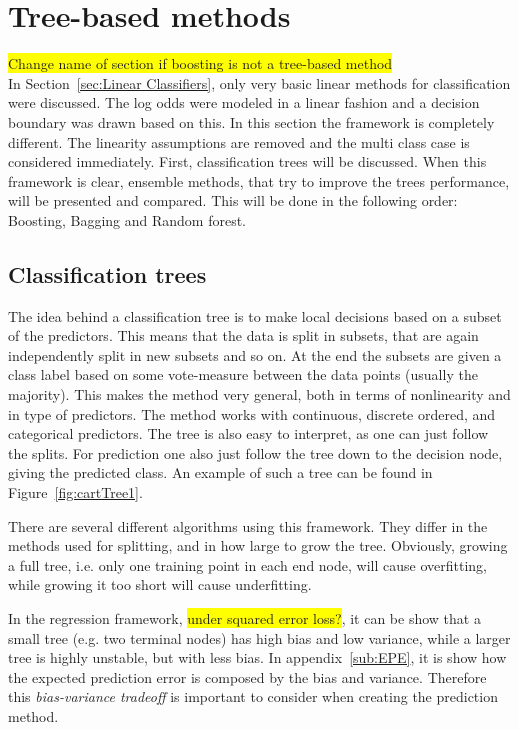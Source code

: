 \section{Tree-based methods}
\label{sec:Tree-based methods}
\colorbox{yellow}{Change name of section if boosting is not a tree-based method}\\
In Section~\ref{sec:Linear Classifiers}, only very basic linear methods for classification were discussed. The log odds were modeled in a linear fashion and a decision boundary was drawn based on this. In this section the framework is completely different. The linearity assumptions are removed and the multi class case is considered immediately. 
First, classification trees will be discussed. When this framework is clear, ensemble methods, that try to improve the trees performance, will be presented and compared. This will be done in the following order: Boosting, Bagging and Random forest. 
%
\subsection{Classification trees}
\label{sub:Classification trees}
The idea behind a classification tree is to make local decisions based on a subset of the predictors. This means that the data is split in subsets, that are again independently split in new subsets and so on. At the end the subsets are given a class label based on some vote-measure between the data points (usually the majority).
This makes the method very general, both in terms of nonlinearity and in type of predictors. The method works with continuous, discrete ordered, and categorical predictors. The tree is also easy to interpret, as one can just follow the splits. For prediction one also just follow the tree down to the decision node, giving the predicted class. An example of such a tree can be found in Figure~\ref{fig:cartTree1}.

There are several different algorithms using this framework. They differ in the methods used for splitting, and in how large to grow the tree. Obviously, growing a full tree, i.e. only one training point in each end node, will cause overfitting, while growing it too short will cause underfitting. 

In the regression framework, \colorbox{yellow}{under squared error loss?}, it can be show that a small tree (e.g. two terminal nodes) has high bias and low variance, while a larger tree is highly unstable, but with less bias. In appendix~\ref{sub:EPE}, it is show how the expected prediction error is composed by the bias and variance. Therefore this \textit{bias-variance tradeoff} is important to consider when creating the prediction method. 

